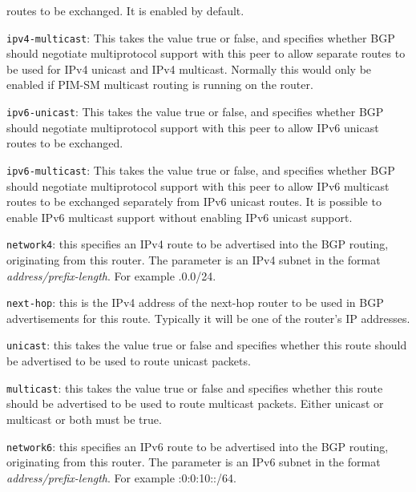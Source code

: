 \begin{description}
\begin{description}
  routes to be exchanged. It is enabled by default.
\item{\tt ipv4-multicast}: This takes the value {\stt true} or {\stt false},
  and specifies whether BGP should
  negotiate multiprotocol support with this peer to allow separate
  routes to be used for IPv4 unicast and IPv4 multicast.  Normally
  this would only be enabled if PIM-SM multicast routing is running on
  the router.
\item{\tt ipv6-unicast}: This takes the value {\stt true} or {\stt false},
  and specifies whether BGP should
  negotiate multiprotocol support with this peer to allow IPv6 unicast
  routes to be exchanged.
\item{\tt ipv6-multicast}: This takes the value {\stt true} or {\stt false},
  and specifies whether BGP should
  negotiate multiprotocol support with this peer to allow IPv6
  multicast routes to be exchanged separately from IPv6 unicast
  routes.  It is possible to enable IPv6 multicast support without
  enabling IPv6 unicast support.
\end{description}
\item{\tt network4}: this specifies an IPv4 route to be advertised
  into the BGP routing, originating from this router.  The parameter
  is an IPv4 subnet in the format {\it address/prefix-length}.  For
  example {.0.0/24}.
\begin{description}
\item{\tt next-hop}: this is the IPv4 address of the next-hop router
  to be used in BGP advertisements for this route.  Typically it will
  be one of the router's IP addresses.
\item{\tt unicast}: this takes the value {\stt true} or {\stt false}
and specifies whether this route should be advertised to be used to
route unicast packets.
\item{\tt multicast}: this takes the value {\stt true} or {\stt false}
and specifies whether this route should be advertised to be used to
route multicast packets.  Either {\stt unicast} or {\stt multicast} or
both must be true.
\end{description}

\item{\tt network6}: this specifies an IPv6 route to be advertised
  into the BGP routing, originating from this router.  The parameter
  is an IPv6 subnet in the format {\it address/prefix-length}.  For
  example {:0:0:10::/64}.
\end{description}

